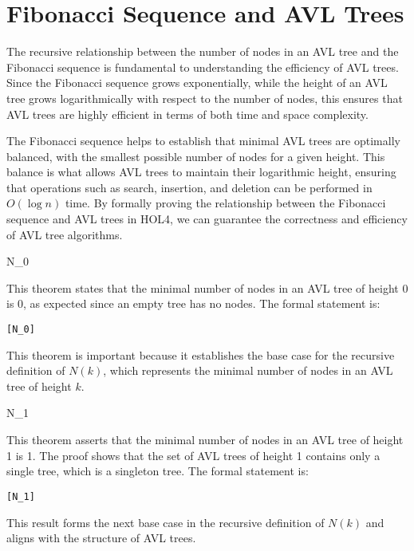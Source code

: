 \section{Fibonacci Sequence and AVL Trees}

    The recursive relationship between the number of nodes in an AVL tree and the Fibonacci sequence is fundamental to understanding the efficiency of AVL trees. Since the Fibonacci sequence grows exponentially, while the height of an AVL tree grows logarithmically with respect to the number of nodes, this ensures that AVL trees are highly efficient in terms of both time and space complexity.

    The Fibonacci sequence helps to establish that minimal AVL trees are optimally balanced, with the smallest possible number of nodes for a given height. This balance is what allows AVL trees to maintain their logarithmic height, ensuring that operations such as search, insertion, and deletion can be performed in \( O(\log n) \) time. By formally proving the relationship between the Fibonacci sequence and AVL trees in HOL4, we can guarantee the correctness and efficiency of AVL tree algorithms.

    \begin{thm}{N\_0}

    This theorem states that the minimal number of nodes in an AVL tree of height 0 is 0, as expected since an empty tree has no nodes. The formal statement is:
    \begin{alltt}
    	[N_0]
    \end{alltt}
    
    \end{thm}
    This theorem is important because it establishes the base case for the recursive definition of \( N(k) \), which represents the minimal number of nodes in an AVL tree of height \( k \).


    \begin{thm}{N\_1}

    This theorem asserts that the minimal number of nodes in an AVL tree of height 1 is 1. The proof shows that the set of AVL trees of height 1 contains only a single tree, which is a singleton tree. The formal statement is:
    \begin{alltt}
    	[N_1]
    \end{alltt}
    
    \end{thm}
    This result forms the next base case in the recursive definition of \( N(k) \) and aligns with the structure of AVL trees.


